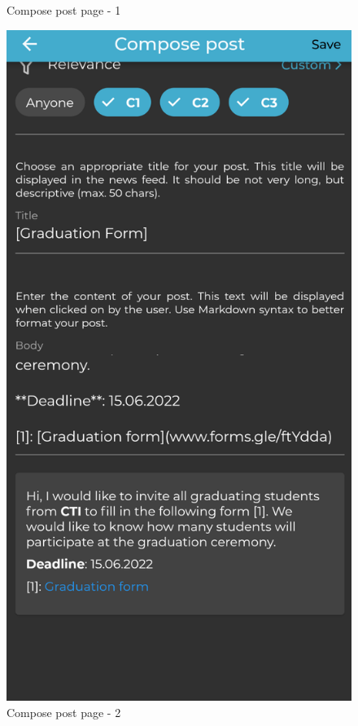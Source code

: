 \begin{figure}[!ht]
\begin{minipage}[b]{0.32\textwidth}
        \caption{Compose post page - 1}
        \label{4:fig:compose-post-1}
    \end{minipage}
    \hfill
    \begin{minipage}[b]{0.32\textwidth}
        \captionsetup{justification=centering}
        \includegraphics[width=\textwidth]{figures/app/final/compose-post-completion-2-final.png}
        \caption{Compose post page - 2}
        \label{4:fig:compose-post-2}
    \end{minipage}
\end{figure}

